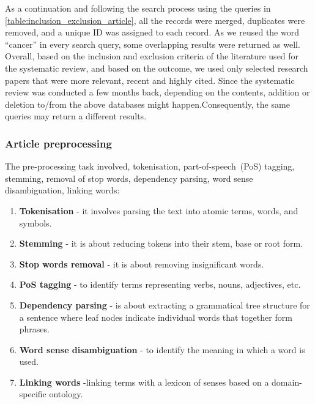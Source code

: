 \hspace*{3.5mm} As a continuation and following the search process using the queries in \cref{table:inclusion_exclusion_article}, all the records were merged, duplicates were removed, and a unique ID was assigned to each record. As we reused the word ``cancer'' in every search query, some overlapping results were returned as well. %
Overall, based on the inclusion and exclusion criteria of the literature used for the systematic review, and based on the outcome, we used only selected research papers that were more relevant, recent and highly cited. Since the systematic review was conducted a few months back, depending on the contents, addition or deletion  to/from  the above databases might happen.Consequently, the same queries may return a different results.

\subsubsection{Article preprocessing}
The pre-processing task involved, tokenisation, part-of-speech~(PoS) tagging, stemming, removal of stop words, dependency parsing, word sense disambiguation, linking words: 

\begin{enumerate}[noitemsep]
    \item \textbf{Tokenisation} - it involves parsing the text into atomic terms, words, and symbols. 
    \item \textbf{Stemming} - it is about reducing tokens into their stem, base or root form. 
    \item \textbf{Stop words removal} - it is about removing insignificant words. 
    \item \textbf{PoS tagging} - to identify terms representing verbs, nouns, adjectives, etc. 
    \item \textbf{Dependency parsing} - is about extracting a grammatical tree structure for a sentence where leaf nodes indicate individual words that together form phrases. 
    \item \textbf{Word sense disambiguation} - to identify the meaning in which a word is used. 
    \item \textbf{Linking words} -linking terms with a lexicon of senses based on a domain-specific ontology. 
\end{enumerate}

